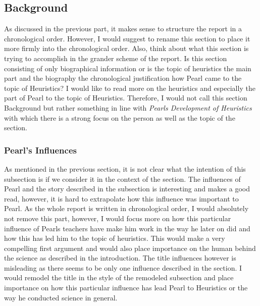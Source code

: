 \documentclass{article}
\begin{document}
\subsection{Background}
As discussed in the previous part, it makes sense to structure the report in a chronological order. However, I would suggest to rename this section to place it more firmly into the chronological order. Also, think about what this section is trying to accomplish in the grander scheme of the report. Is this section consisting of only biographical information or is the topic of heuristics the main part and the biography the chronological justification how Pearl came to the topic of Heuristics? I would like to read more on the heuristics and especially the part of Pearl to the topic of Heuristics. Therefore, I would not call this section Background but rather something in line with \textit{Pearls Development of Heuristics} with which there is a strong focus on the person as well as the topic of the section.

\subsubsection{Pearl's Influences}
As mentioned in the previous section, it is not clear what the intention of this subsection is if we consider it in the context of the section. The influences of Pearl and the story described in the subsection is interesting and makes a good read, however, it is hard to extrapolate how this influence was important to Pearl. As the whole report is written in chronological order, I would absolutely not remove this part, however, I would focus more on how this particular influence of Pearls teachers have make him work in the way he later on did and how this has led him to the topic of heuristics. This would make a very compelling first argument and would also place importance on the human behind the science as described in the introduction. The title influences however is misleading as there seems to be only one influence described in the section. I would remodel the title in the style of the remodeled subsection and place importance on how this particular influence has lead Pearl to Heuristics or the way he conducted science in general.
\end{document}

